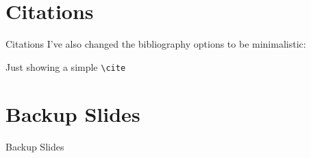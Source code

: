 \documentclass[aspectratio=169]{beamer}
\begin{document}
\section{Citations}
\begin{frame}[allowframebreaks]{Citations}
	I've also changed the bibliography options to be minimalistic:

	Just showing a simple \texttt{\textbackslash{}cite} \cite{AlexNet}
	\vfill
	\printbibliography
\end{frame}

\appendix %
\section*{Backup Slides}
\begin{frame}
	\centering
	\vfill
	{\fontsize{40}{50}\selectfont Backup Slides}
	\vfill
\end{frame}

\end{document}
